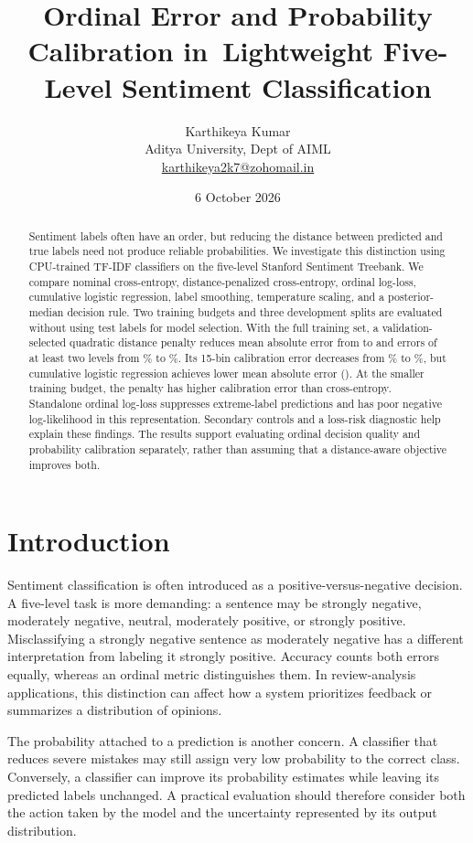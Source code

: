 \documentclass[10pt,twocolumn]{article}
\title{Ordinal Error and Probability Calibration in\ Lightweight Five-Level Sentiment Classification}
\author{Karthikeya Kumar\\
\small Aditya University, Dept of AIML\\
\small \href{mailto:karthikeya2k7@zohomail.in}{karthikeya2k7@zohomail.in}}
\date{6 October 2026}
\begin{document}
\maketitle
\begin{abstract}
Sentiment labels often have an order, but reducing the distance between predicted and true labels need not produce reliable probabilities. We investigate this distinction using CPU-trained TF-IDF classifiers on the five-level Stanford Sentiment Treebank. We compare nominal cross-entropy, distance-penalized cross-entropy, ordinal log-loss, cumulative logistic regression, label smoothing, temperature scaling, and a posterior-median decision rule. Two training budgets and three development splits are evaluated without using test labels for model selection. With the full training set, a validation-selected quadratic distance penalty reduces mean absolute error from \FullCEMAE{} to \FullDPtwoMAE{} and errors of at least two levels from \FullCESevere\% to \FullDPtwoSevere\%. Its 15-bin calibration error decreases from \FullCEECE\% to \FullDPtwoECE\%, but cumulative logistic regression achieves lower mean absolute error (\FullCumMAE{}). At the smaller training budget, the penalty has higher calibration error than cross-entropy. Standalone ordinal log-loss suppresses extreme-label predictions and has poor negative log-likelihood in this representation. Secondary controls and a loss-risk diagnostic help explain these findings. The results support evaluating ordinal decision quality and probability calibration separately, rather than assuming that a distance-aware objective improves both.
\end{abstract}

\section{Introduction}
Sentiment classification is often introduced as a positive-versus-negative decision. A five-level task is more demanding: a sentence may be strongly negative, moderately negative, neutral, moderately positive, or strongly positive. Misclassifying a strongly negative sentence as moderately negative has a different interpretation from labeling it strongly positive. Accuracy counts both errors equally, whereas an ordinal metric distinguishes them. In review-analysis applications, this distinction can affect how a system prioritizes feedback or summarizes a distribution of opinions.

The probability attached to a prediction is another concern. A classifier that reduces severe mistakes may still assign very low probability to the correct class. Conversely, a classifier can improve its probability estimates while leaving its predicted labels unchanged. A practical evaluation should therefore consider both the action taken by the model and the uncertainty represented by its output distribution.
\end{document}
